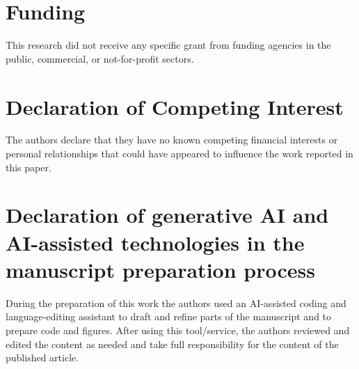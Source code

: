 \documentclass[12pt]{article}
\begin{document}
\section*{Funding}
This research did not receive any specific grant from funding agencies in the public, commercial, or not-for-profit sectors.

\section*{Declaration of Competing Interest}
The authors declare that they have no known competing financial interests or personal relationships that could have appeared to influence the work reported in this paper.

\section*{Declaration of generative AI and AI-assisted technologies in the manuscript preparation process}
During the preparation of this work the authors used an AI-assisted coding and language-editing assistant to draft and refine parts of the manuscript and to prepare code and figures. After using this tool/service, the authors reviewed and edited the content as needed and take full responsibility for the content of the published article.
\end{document}
